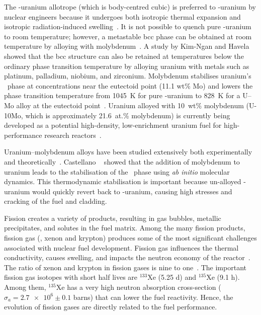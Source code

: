The \mbox{\textgamma-uranium} allotrope (which is body-centred cubic) is
preferred to \mbox{\textalpha-uranium} by nuclear engineers because it
undergoes both isotropic thermal expansion and isotropic radiation-induced
swelling~\cite{kittel1993history}.
It is not possible to quench pure \mbox{\textgamma-uranium} to room
temperature; however, a metastable bcc phase can be obtained at room
temperature by alloying with
molybdenum~\cite{wilson1949structures, sinha2010phase,
    yakel1969crystal,sinha2010effect}.
A study by Kim-Ngan and Havela~\cite{kim2016superconductivity} showed that the
bcc structure can also be retained at temperatures below the ordinary phase
transition temperature by alloying uranium with metals such as platinum,
palladium, niobium, and zirconium.
Molybdenum stabilises uranium's \textgamma\ phase at concentrations near the
eutectoid point (11.1 wt\% Mo) and lowers the phase transition temperature from
1045~K for pure \textgamma-uranium to 828~K for a U--Mo alloy at the eutectoid
point~\cite{ASM-Alloy-Mo,Berche2011}.
Uranium alloyed with 10~wt\% molybdenum (U-10Mo, which is approximately
21.6~at.\% molybdenum) is currently being developed as a potential
high-density, low-enrichment uranium fuel for high-performance research
reactors~\cite{prabhakaran2017u, meyer2014irradiation, williams2017post}.

Uranium--molybdenum alloys have been studied extensively both
experimentally~\cite{dwight1960uranium,tangri1961metastable, sinha2010phase}
and theoretically~\cite{berche2011calphad,zhang2010thermodynamic,
    losada2019ground, landa2011density,alonso2007role}.
Castellano \etal~\cite{castellano2020thermodynamic} showed that the
addition of molybdenum to uranium leads to the stabilisation of the
\textgamma\ phase using \textit{ab initio} molecular dynamics.
This thermodynamic stabilisation is important because un-alloyed
\textgamma-uranium would quickly revert back to \textalpha-uranium, causing high stresses and
cracking of the fuel and cladding. %

Fission creates a variety of products, resulting in gas bubbles,
metallic precipitates, and solutes in the fuel matrix.
Among the many fission products, fission gas (\ie, xenon and krypton) produces
some of the most significant challenges associated with nuclear fuel
development. Fission gas influences the thermal conductivity,
causes swelling, and impacts the neutron economy of the
reactor~\cite{rondinella2010high,iasir2018estimation}. The ratio of xenon and krypton in fission gases is nine to one~\cite{rest2006u}. The important fission gas isotopes with short half lives are $^{133}$Xe (5.25 d) and $^{135}$Xe (9.1 h). Among them, $^{135}$Xe has a very high neutron absorption cross-section ($\sigma_a = \num{2.7e6}\pm 0.1$ barns) that can lower the fuel reactivity. Hence, the evolution of fission gases are directly related to the fuel performance. 

